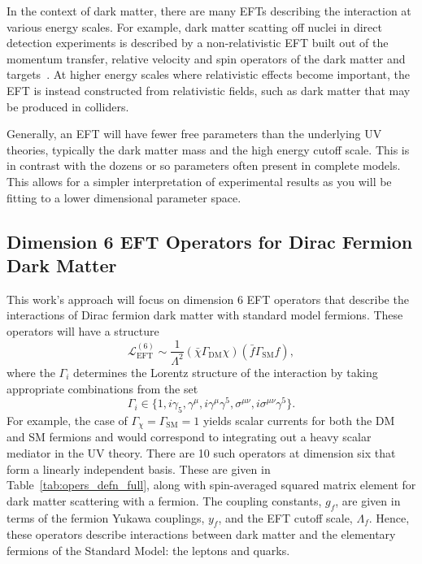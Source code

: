 In the context of dark matter, there are many EFTs describing the interaction at various energy scales. For example, dark matter scatting off nuclei in direct detection experiments is described by a non-relativistic EFT built out of the momentum transfer, relative velocity and spin operators of the dark matter and targets~\cite{Cirelli:2013ufw_oct_Toolsmodelindependentbounds, Fitzpatrick:2012ix_EffectiveFieldTheory}. At higher energy scales where relativistic effects become important, the EFT is instead constructed from relativistic fields, such as dark matter that may be produced in colliders.

Generally, an EFT will have fewer free parameters than the underlying UV theories, typically the dark matter mass and the high energy cutoff scale. This is in contrast with the dozens or so parameters often present in complete models. This allows for a simpler interpretation of experimental results as you will be fitting to a lower dimensional parameter space. 

\subsection{Dimension 6 EFT Operators for Dirac Fermion Dark Matter}
This work's approach will focus on dimension 6 EFT operators that describe the interactions of Dirac fermion dark matter with standard model fermions. These operators will have a structure 
\begin{equation}
    \mathcal{L}_\mathrm{EFT}^{(6)} \sim \frac{1}{\Lambda^2}(\bar{\chi}\Gamma_\mathrm{DM} \chi)(\bar{f}\Gamma_{\mathrm{SM}}f),
\end{equation}
where the $\Gamma_i$ determines the Lorentz structure of the interaction by taking appropriate combinations from the set
\begin{equation}
    \Gamma_i\in \{1, i\gamma_5, \gamma^\mu, i\gamma^\mu \gamma^5, \sigma^{\mu\nu}, i \sigma^{\mu\nu}\gamma^5\}.
\end{equation}
For example, the case of $\Gamma_\chi = \Gamma_\mathrm{SM} = 1$ yields scalar currents for both the DM and SM fermions and would correspond to integrating out a heavy scalar mediator in the UV theory. There are 10 such operators at dimension six that form a linearly independent basis. These are given in Table~\ref{tab:opers_defn_full}, along with spin-averaged squared matrix element for dark matter scattering with a fermion. The coupling constants, $g_f$, are given in terms of the fermion Yukawa couplings, $y_f$, and the EFT cutoff scale, $\Lambda_f$. Hence, these operators describe interactions between dark matter and the elementary fermions of the Standard Model: the leptons and quarks. 





